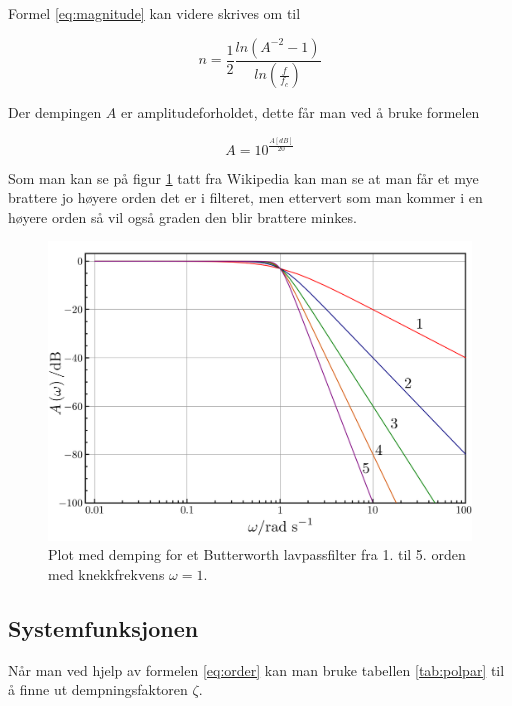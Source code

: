 Formel \ref{eq:magnitude} kan videre skrives om til

\begin{equation}
	n=\frac{1}{2}\frac{ln(A^{-2}-1)}{ln(\frac{f}{f_c})}
	\label{eq:order}
\end{equation}

Der dempingen $A$ er amplitudeforholdet, dette får man ved å bruke formelen

\begin{equation}
	A=10^{\frac{A[dB]}{20}}
	\label{eq:decibeltonone}
\end{equation}

Som man kan se på figur \ref{fig:05order} tatt fra Wikipedia \cite{wikipediacontributors_2022_butterworth} kan man se at man får et mye brattere jo høyere orden det er i filteret, men ettervert som man kommer i en høyere orden så vil også graden den blir brattere minkes. 

\begin{figure}[!hbt]
	\centering
	\includegraphics[scale=0.2]{./Images/02Concept/04orders.png}
	\caption{Plot med demping for et Butterworth lavpassfilter fra 1. til 5. orden med knekkfrekvens $\omega=1$.}
	\label{fig:05order}
\end{figure}

\subsection{Systemfunksjonen}
\label{sec:Systemfunksjonen}

Når man ved hjelp av formelen \ref{eq:order} kan man bruke tabellen \ref{tab:polpar} til å finne ut dempningsfaktoren $\zeta$.

